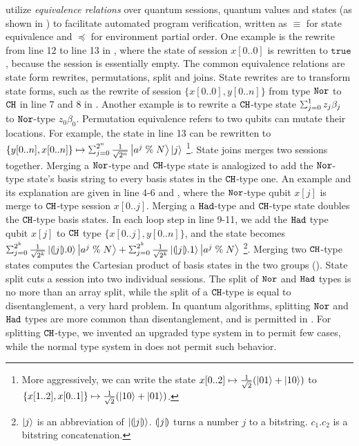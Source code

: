 \qafny utilize \emph{equivalence relations} over quantum sessions, quantum values and states (as shown in ) to facilitate automated program verification, written as $\equiv$ for state equivalence and $\preceq$ for environment partial order. One example is the rewrite from line 12 to line 13 in , where the state of session $x[0..0]$ is rewritten to $\texttt{true}$, because the session is essentially empty.
The common equivalence relations are state form rewrites, permutations, split and joins. 
State rewrites are to transform state forms, such as the rewrite of session $\{x[0..0],y[0..n]\}$ from type $\texttt{Nor}$ to $\texttt{CH}$ in line 7 and 8 in . Another example is to rewrite a $\texttt{CH}$-type state $\ssum{j=0}{1}{z_j\beta_j}$ to $\texttt{Nor}$-type ${z_0\beta_0}$. Permutation equivalence refers to two qubits can mutate their locations. For example, the state in line 13 can be rewritten to $\{y[0..n],x[0..n]\} \mapsto \scha{2^{n}}{\frac{1}{\sqrt{2^{n}}}}{a^{j}\;\%\;N}{\ket{j}}$ \footnote{More aggressively, we can write the state $x[0..2]\mapsto \frac{1}{\sqrt{2}}(\left\vert{01}\right\rangle+\left\vert{10}\right\rangle)$ to $\{x[1..2],x[0..1]\}\mapsto \frac{1}{\sqrt{2}}(\left\vert{10}\right\rangle+\left\vert{01}\right\rangle)$.}.
State joins merges two sessions together. Merging a $\texttt{Nor}$-type and $\texttt{CH}$-type state is analogized to add the $\texttt{Nor}$-type state's basis string to every basis states in the $\texttt{CH}$-type one. An example and its explanation are given in 
 line 4-6 and , 
where the $\texttt{Nor}$-type qubit $x[j]$ is merge to $\texttt{CH}$-type session $x[0..j]$.
Merging a $\texttt{Had}$-type and $\texttt{CH}$-type state doubles the $\texttt{CH}$-type basis states. 
In each loop step in  line 9-11, we add the $\texttt{Had}$ type qubit $x[j]$ to $\texttt{CH}$ type $\{x[0..j],y[0..n]\}$, and the state becomes $\scha{2^k}{\frac{1}{\sqrt{2^k}}}{\tos{j}.0}{\ket{a^{j}\;\%\;N}}+\scha{2^k}{\frac{1}{\sqrt{2^k}}}{\tos{j}.1}{\ket{a^{j}\;\%\;N}}$ \footnote{$\left\vert{j}\right\rangle$ is an abbreviation of $\left\vert{(\!| j |\!)}\right\rangle$. $(\!| j |\!)$ turns a number $j$ to a bitstring. $c_1.c_2$ is a bitstring concatenation. }.
Merging two $\texttt{CH}$-type states computes the Cartesian product of basis states in the two groups ().
State split cuts a session into two individual sessions. The split of $\texttt{Nor}$ and $\texttt{Had}$ types is no more than an array split, while the split of a $\texttt{CH}$-type is equal to disentanglement, a very hard problem. In quantum algorithms, splitting $\texttt{Nor}$ and $\texttt{Had}$ types are more common than disentanglement, and is permitted in \qafny. For splitting $\texttt{CH}$-type, we invented an upgraded type system in  to permit few cases, while the normal \qafny type system in  does not permit such behavior. 

